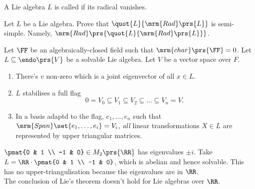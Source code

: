 \documentclass[10pt,a4paper,twoside,openany,hidelinks]{book}
\begin{document}
\begin{definition}
A Lie algebra $L$ is called  if its radical vanishes.
\end{definition}
\begin{exercise}
Let $L$ be a Lie algebra. Prove that $\quot{L}{\mrm{Rad}\prs{L}}$ is semi-simple. Namely, $\mrm{Rad}\prs{\quot{L}{\mrm{Rad}\prs{L}}}$.
\end{exercise}
\begin{theorem}
Let $\FF$ be an algebraically-closed field such that $\mrm{char}\prs{\FF} = 0$.
Let $L \subseteq \endo\prs{V}$ be a solvable Lie algebra. Let $V$ be a vector space over $F$.
\begin{enumerate}
\item There's $v$ non-zero which is a joint eigenvector of all $x \in L$. \label{solvable joint eigenvector}
\item $L$ stabilises a full flag
\[0 = V_0 \subseteq V_1 \subseteq V_2 \subseteq \ldots \subseteq V_n = V\text{.}\]
\item In a basis adaptd to the flag, $e_1, \ldots, e_n$ such that $\mrm{Span}\set{e_1, \ldots, e_i} = V_i$, \emph{all} linear transformations $X \in L$ are represented by upper triangular matrices.
\end{enumerate}
\end{theorem}
\begin{example}
$\pmat{0 & 1 \\ -1 & 0} \in M_2\prs{\RR}$ has eigenvalues $\pm i$. Take $L = \RR \cdot \pmat{0 & 1 \\ -1 & 0}$, which is abelian and hence solvable. This has no upper-triangulisation because the eigenvalues are in $\RR$.\\
The conclusion of Lie's theorem doesn't hold for Lie algebras over $\RR$.
\end{example}
\end{document}
